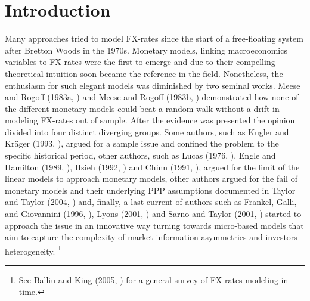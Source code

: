 \section{Introduction}

%
%
Many approaches tried to model FX-rates since the start of a
free-floating system after Bretton Woods in the 1970s. Monetary
models, linking macroeconomics variables to FX-rates were the first to
emerge and due to their compelling theoretical intuition soon became
the reference in the field. Nonetheless, the enthusiasm for such
elegant models was diminished by two seminal works. Meese and Rogoff
(1983a, \cite{MeeseRogoffa}) and Meese and Rogoff (1983b,
\cite{MeeseRogoffb}) demonstrated how none of the different monetary
models could beat a random walk without a drift in modeling FX-rates
out of sample. After the evidence was presented the opinion
divided %
into four distinct diverging groups. Some authors, such as Kugler and
Kr{\"a}ger (1993, \cite{KuglerKrager}), argued for a sample issue and
confined the problem to the specific historical period, other authors,
such as Lucas (1976, \cite{Lucas}), Engle and Hamilton (1989,
\cite{EngleHamilton}), Hsieh (1992, \cite{Hsieh}) and Chinn (1991,
\cite{Chinn}), argued for the limit of the linear models to approach
monetary models, other authors argued for the fail of monetary models
and their underlying PPP assumptions documented in Taylor and Taylor
(2004, \cite{TaylorTaylor}) and, finally, a last current of authors
such as Frankel, Galli, and Giovannini (1996,
\cite{FrenkelGalliGiovannini}), Lyons (2001, \cite{Lyons}) and Sarno
and Taylor (2001, \cite{SarnoTaylor}) started to approach the issue in
an innovative way turning towards micro-based models that aim to
capture the complexity of market information asymmetries and investors
heterogeneity.  \footnote{See Balliu and King (2005,
  \cite{BalliuKing}) for a general survey of FX-rates modeling
  in time.}


